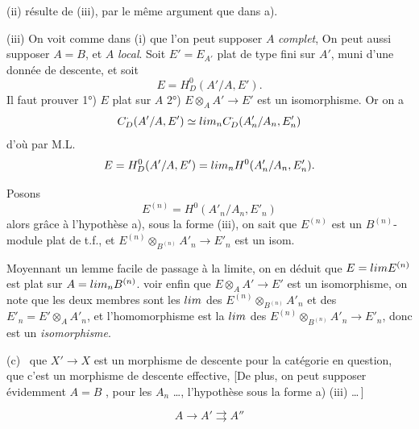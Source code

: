 \documentclass[11pt,a4paper]{article}
\begin{document}
(ii)  résulte de (iii), par le même argument que dans a).

(iii) \struck{\ill{}} On voit comme dans (i) que l'on peut supposer $A$
 \emph{complet}, 
 On peut aussi supposer $A = B$, et $A$ \emph{local}. Soit
$E' = E_{A'}$ plat de type fini sur $A'$, muni d'une donnée de descente, et
soit
\[
  E = H^0_D(A'/A, E') .
\]
Il faut prouver 1°) $E$ plat sur $A$ 2°) $E \otimes_A A' \to E'$ est un
isomorphisme. Or on a
\[
  C^{\cdot}_D(A'/A, E') \simeq \varprojlim_n C^{\cdot}_D(A'_n/A_n, E'_n)
\]
d'où par M.L.
\[
  E = H^0_D(A'/A, E') = \varprojlim_n H^0(A'_n/A_n, E'_n) .
\]

Posons
\[
  E^{(n)} = H^0(A'_n/A_n, E'_n)
\]
alors grâce à l'hypothèse a), sous la forme (iii), on sait que $E^{(n)}$
est un $B^{(n)}$-module plat de t.f., et
$E^{(n)} \otimes_{B^{(n)}} A'_n \to E'_n$ est un isom.


Moyennant un lemme facile de passage à la limite, on en déduit que
$E = \varprojlim E^{(n)}$ est plat sur $A = \varprojlim_n B^{(n)}$.
 voir enfin que $E \otimes_A A' \to E'$ est un
isomorphisme, on note que les deux membres sont 
les $\varprojlim$ des $E^{(n)} \otimes_{B^{(n)}} A'_n$ et des
$E'_n = E' \otimes_A A'_n$, et l'homomorphisme est la $\varprojlim$ des
 $E^{(n)} \otimes_{B^{(n)}} A'_n \to E'_n$, donc
est un \emph{isomorphisme}.

(c)\  que $X' \to X$ est un morphisme de
descente pour la catégorie en question,  que c'est un
morphisme de descente effective, \ill{} \ill{} [De plus, on peut supposer
évidemment $A = B$ \ill{}, \ill{} \ill{} \ill{} \ill{} \ill{} pour les
$A_n$ \ldots, \ill{} l'hypothèse sous la forme a) (iii) \ldots\,]

\[
  A \longrightarrow A' \rightrightarrows A''
\]


\end{document}
